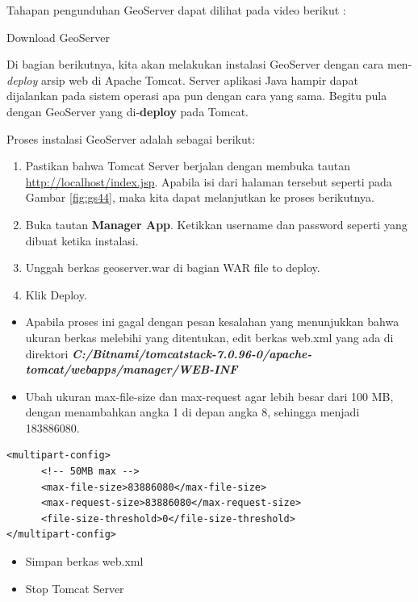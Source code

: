\documentclass[]{book}
\begin{document}
Tahapan pengunduhan GeoServer dapat dilihat pada video berikut :

\label{fig:embed2}Download GeoServer

Di bagian berikutnya, kita akan melakukan instalasi GeoServer dengan cara men-\emph{deploy} arsip web di Apache Tomcat. Server aplikasi Java hampir dapat dijalankan pada sistem operasi apa pun dengan cara yang sama. Begitu pula dengan GeoServer yang di-\textbf{deploy} pada Tomcat.

Proses instalasi GeoServer adalah sebagai berikut:

\begin{enumerate}
\def\labelenumi{\arabic{enumi}.}
\item
  Pastikan bahwa Tomcat Server berjalan dengan membuka tautan \url{http://localhost/index.jsp}. Apabila isi dari halaman tersebut seperti pada Gambar \ref{fig:gs44}, maka kita dapat melanjutkan ke proses berikutnya.
\item
  Buka tautan \textbf{Manager App}. Ketikkan username dan password seperti yang dibuat ketika instalasi.
\item
  Unggah berkas geoserver.war di bagian WAR file to deploy.
\item
  Klik Deploy.
\end{enumerate}

\begin{itemize}
\item
  Apabila proses ini gagal dengan pesan kesalahan yang menunjukkan bahwa ukuran berkas melebihi yang ditentukan, edit berkas web.xml yang ada di direktori \textbf{\emph{C:/Bitnami/tomcatstack-7.0.96-0/apache-tomcat/webapps/manager/WEB-INF}}
\item
  Ubah ukuran max-file-size dan max-request agar lebih besar dari 100 MB, dengan menambahkan angka 1 di depan angka 8, sehingga menjadi 183886080.
\end{itemize}

\begin{verbatim}
<multipart-config>
      <!-- 50MB max -->
      <max-file-size>83886080</max-file-size>
      <max-request-size>83886080</max-request-size>
      <file-size-threshold>0</file-size-threshold>
</multipart-config>
\end{verbatim}

\begin{itemize}
\item
  Simpan berkas web.xml
\item
  Stop Tomcat Server
\end{itemize}
\end{document}
